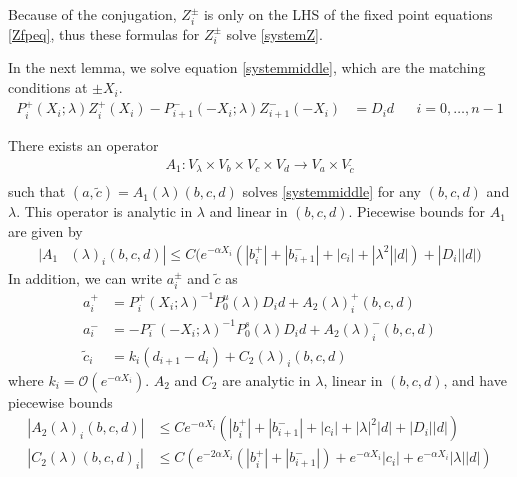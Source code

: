 \documentclass[thesis.tex]{subfiles}
\begin{document}
Because of the conjugation, $Z_i^\pm$ is only on the LHS of the fixed point equations \eqref{Zfpeq}, thus these formulas for $Z_i^\pm$ solve \eqref{systemZ}.

In the next lemma, we solve equation \eqref{systemmiddle}, which are the matching conditions at $\pm X_i$.
\begin{align*}
P_i^+(X_i; \lambda) Z_i^+(X_i) - P_{i+1}^-(-X_i; \lambda) Z_{i+1}^-(-X_i) &= D_i d && i = 0, \dots, n-1
\end{align*}

\begin{lemma}\label{Zinv1}
There exists an operator
\begin{align*}
A_1: V_\lambda \times V_b \times V_c \times V_d \rightarrow V_a \times V_{\tilde{c}} \\
\end{align*}
such that $(a, \tilde{c}) = A_1(\lambda)(b, c, d)$ solves \eqref{systemmiddle} for any $(b, c, d)$ and $\lambda$. This operator is analytic in $\lambda$ and linear in $(b, c, d)$. Piecewise bounds for $A_1$ are given by
\begin{align}\label{A1bound}
|A_1&(\lambda)_i(b, c, d)|
\leq C \Big( e^{-\alpha X_i} (|b_i^+| + |b_{i+1}^-| + |c_i| + |\lambda^2||d|) + |D_i||d| \Big)
\end{align} 
In addition, we can write $a_i^\pm$ and $\tilde{c}$ as 
\begin{align*}
a_i^+ &= P_i^+(X_i; \lambda)^{-1} P_0^u(\lambda) D_i d + A_2(\lambda)_i^+(b, c, d) \\
a_i^- &= -P_i^-(-X_i; \lambda)^{-1} P_0^s(\lambda) D_i d + A_2(\lambda)_i^-(b, c, d) \\
\tilde{c}_i &= k_i (d_{i+1} - d_i) + C_2(\lambda)_i(b, c, d)
\end{align*}
where $k_i = \mathcal{O}(e^{-\alpha X_i})$. $A_2$ and $C_2$ are analytic in $\lambda$, linear in $(b, c, d)$, and have piecewise bounds
\begin{align}
|A_2(\lambda)_i(b, c, d)|
&\leq C e^{-\alpha X_i} \left( |b_i^+| + |b_{i+1}^-| + |c_i| + |\lambda|^2|d| + |D_i||d| \right) \label{A2bound} \\
|C_2(\lambda)(b, c, d)_i| &\leq 
C \left( e^{-2 \alpha X_i} (|b_i^+| + |b_{i+1}^-|) + e^{-\alpha X_i}|c_i| + e^{-\alpha X_i}|\lambda||d| \right) \label{C2bound}
\end{align}


\end{lemma}
\end{document}
